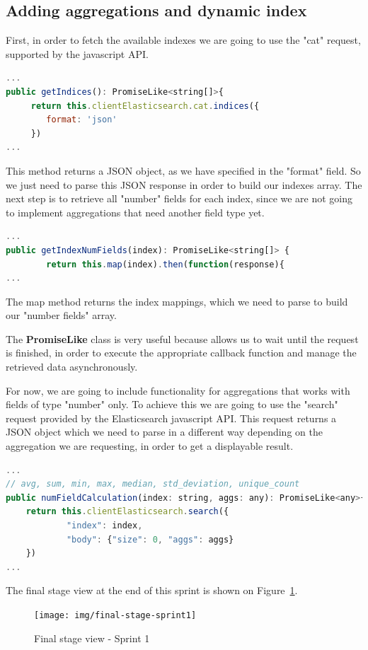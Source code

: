 \documentclass[a4paper, 12pt, english]{book}
\begin{document}
\subsection{Adding aggregations and dynamic index}
\label{sec:adding-aggregations}
First, in order to fetch the available indexes we are going to use the "cat" request, supported by the javascript API.
\begin{lstlisting}[language=javascript]
...
public getIndices(): PromiseLike<string[]>{
     return this.clientElasticsearch.cat.indices({
     	format: 'json'
     })
...
\end{lstlisting}
This method returns a JSON object, as we have specified in the "format" field. So we just need to parse this JSON response in order to build our indexes array. The next step is to retrieve all "number" fields for each index, since we are not going to implement aggregations that need another field type yet.
\begin{lstlisting}[language=javascript]
...
public getIndexNumFields(index): PromiseLike<string[]> {
 		return this.map(index).then(function(response){
...
\end{lstlisting}
The map method returns the index mappings, which we need to parse to build our "number fields" array.

The \textbf{PromiseLike} class is very useful because allows us to wait until the request is finished, in order to execute the appropriate callback function and manage the retrieved data asynchronously.

For now, we are going to include functionality for aggregations that works with fields of type "number" only. To achieve this we are going to use the "search" request provided by the Elasticsearch javascript API. This request returns a JSON object which we need to parse in a different way depending on the aggregation we are requesting, in order to get a displayable result.
\begin{lstlisting}[language=javascript]
...
// avg, sum, min, max, median, std_deviation, unique_count
public numFieldCalculation(index: string, aggs: any): PromiseLike<any>{
	return this.clientElasticsearch.search({
			"index": index,
			"body": {"size": 0, "aggs": aggs}
	})
...
\end{lstlisting}

The final stage view at the end of this sprint is shown on Figure~\ref{fig:sprint1-final-stage}.
\begin{figure}
  \centering
  \texttt{[image: img/final-stage-sprint1]}
  \caption{Final stage view - Sprint 1}
  \label{fig:sprint1-final-stage}
\end{figure}
\end{document}
